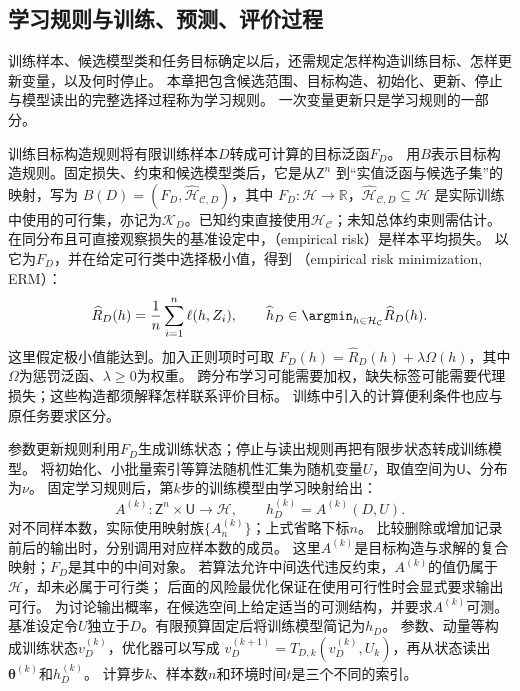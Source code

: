 \subsection{学习规则与训练、预测、评价过程}
\label{sec:future-learning-common-objects}
\label{sec:future-sampling-and-empirical-objective}
\label{sec:future-population-empirical-computation}

训练样本、候选模型类和任务目标确定以后，还需规定怎样构造训练目标、怎样更新变量，以及何时停止。
本章把包含候选范围、目标构造、初始化、更新、停止与模型读出的完整选择过程称为学习规则。
一次变量更新只是学习规则的一部分。

训练目标构造规则将有限训练样本$D$转成可计算的目标泛函$F_D$。
用$B$表示目标构造规则。固定损失、约束和候选模型类后，它是从$\mathsf Z^n$
到“实值泛函与候选子集”的映射，写为
$B(D)=(F_D,\widehat{\mathcal H}_{\mathcal C,D})$，其中
$F_D:\mathcal H\to\mathbb R$，$\widehat{\mathcal H}_{\mathcal C,D}\subseteq\mathcal H$
是实际训练中使用的可行集，亦记为$\mathcal K_D$。已知约束直接使用$\mathcal H_{\mathcal C}$；未知总体约束则需估计。
在同分布且可直接观察损失的基准设定中，（empirical risk）是样本平均损失。
以它为$F_D$，并在给定可行类中选择极小值，得到
（empirical risk minimization, ERM）：
\begin{equation}
  \widehat R_D(h)=\frac1n\sum_{i=1}^n\ell(h,Z_i),\qquad
  \widehat h_D\in\argmin_{h\in\mathcal H_{\mathcal C}}\widehat R_D(h).
  \label{eq:future-unified-empirical-problem}
\end{equation}
这里假定极小值能达到。加入正则项时可取
$F_D(h)=\widehat R_D(h)+\lambda\Omega(h)$，其中$\Omega$为惩罚泛函、$\lambda\geq0$为权重。
跨分布学习可能需要加权，缺失标签可能需要代理损失；这些构造都须解释怎样联系评价目标。
训练中引入的计算便利条件也应与原任务要求区分。

参数更新规则利用$F_D$生成训练状态；停止与读出规则再把有限步状态转成训练模型。
将初始化、小批量索引等算法随机性汇集为随机变量$U$，取值空间为$\mathsf U$、分布为$\nu$。
固定学习规则后，第$k$步的训练模型由学习映射给出：
\begin{equation}
  A^{(k)}:\mathsf Z^n\times\mathsf U\to\mathcal H,
  \qquad h_D^{(k)}=A^{(k)}(D,U).
  \label{eq:future-learning-algorithm-output}
\end{equation}
对不同样本数，实际使用映射族$\{A_n^{(k)}\}$；上式省略下标$n$。
比较删除或增加记录前后的输出时，分别调用对应样本数的成员。
这里$A^{(k)}$是目标构造与求解的复合映射；$F_D$是其中的中间对象。
若算法允许中间迭代违反约束，$A^{(k)}$的值仍属于$\mathcal H$，却未必属于可行类；
后面的风险最优化保证在使用可行性时会显式要求输出可行。
为讨论输出概率，在候选空间上给定适当的可测结构，并要求$A^{(k)}$可测。
基准设定令$U$独立于$D$。有限预算固定后将训练模型简记为$h_D$。
参数、动量等构成训练状态$v_D^{(k)}$，优化器可以写成
$v_D^{(k+1)}=T_{D,k}(v_D^{(k)},U_k)$，再从状态读出$\bm\theta^{(k)}$和$h_D^{(k)}$。
计算步$k$、样本数$n$和环境时间$t$是三个不同的索引。

